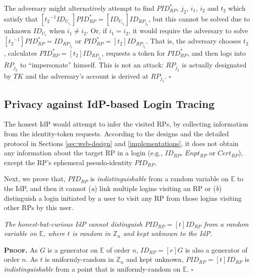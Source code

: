 The adversary might alternatively attempt to find $PID_{RP}^{*}$, ${j_2}$, ${i_1}$, ${i_2}$ and $t_2$ which satisfy that $[{{t_2}^{-1}}ID_{U_{i_1}}]PID_{RP}^{*} = [ID_{U_{i_2}}]ID_{RP_{j_2}}$,
        but this cannot be solved due to unknown $ID_{U_{i}}$ when ${i_1} \neq {i_2}$.
Or, if ${i_1} = {i_2}$, 
    it would require the adversary to solve $[{{t_2}^{-1}}]PID_{RP}^{*} = ID_{RP_{j_2}}$
        or $PID_{RP}^{*} = [t_2]ID_{RP_{j_2}}$.
That is,
    the adversary chooses $t_2$, calculates $PID_{RP}^{*} = [t_2]ID_{RP_{j_2}}$, requests a token for $PID_{RP}^{*}$, and then logs into $RP_{j_2}$ to ``impersonate'' himself.
This is not an attack: $RP_{j_2}$ is actually designated by $TK$ and the adversary's account is derived at $RP_{j_2}$.
\hfill $\square$

\subsection{Privacy against IdP-based Login Tracing}
\label{subsec:IdP-privacy}

The honest IdP would attempt to infer the visited RPs,
by collecting information from the identity-token requests.
According to the designs and the detailed protocol in Sections \ref{sec:web-design} and \ref{implementations},
 it does not obtain any information about the target RP in a login (e.g., $ID_{RP}$, $Enpt_{RP}$ or $Cert_{RP}$), except the RP's ephemeral pseudo-identity $PID_{RP}$.

Next, we prove that, $PID_{RP}$ is \emph{indistinguishable} from a random variable on $\mathbb{E}$ to the IdP,
    and then
 it cannot (\emph{a}) link multiple logins visiting an RP or (\emph{b}) distinguish a login initiated by a user to visit any RP from those logins visiting other RPs by this user. %


\vspace{1.5mm}
\begin{thm}
\emph{The honest-but-curious IdP cannot distinguish $PID_{RP} = [t]ID_{RP}$ from a random variable on $\mathbb{E}$, where $t$ is random in $\mathbb{Z}_n$ and kept unknown to the IdP.}\label{thm-idp-untraceability}
\end{thm}

\noindent\textbf{\textsc{Proof.}}
As $G$ is a generator on $\mathbb{E}$ of order $n$, $ID_{RP} = [r]G$ is also a generator of order $n$.
As $t$ is uniformly-random in $\mathbb{Z}_n$ and kept unknown, $PID_{RP} = [t]ID_{RP}$ is \emph{indistinguishable} from a point that is uniformly-random on $\mathbb{E}$.
\hfill $\square$

